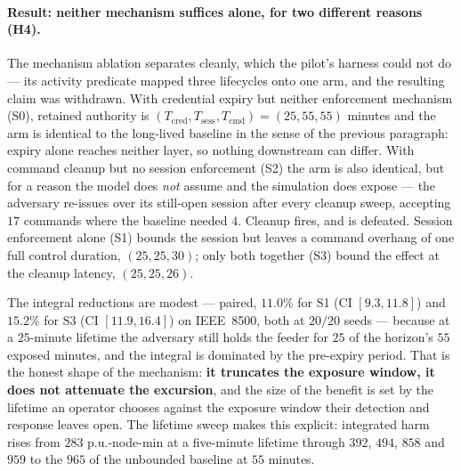 \paragraph{Result: neither mechanism suffices alone, for two different reasons (H4).} The
mechanism ablation separates cleanly, which the pilot's harness could not do --- its activity
predicate mapped three lifecycles onto one arm, and the resulting claim was withdrawn. With
credential expiry but neither enforcement mechanism (S0), retained authority is
$(T_{\mathrm{cred}}, T_{\mathrm{sess}}, T_{\mathrm{cmd}}) = (25, 55, 55)$ minutes and the arm is
identical to the long-lived baseline in the sense of the previous paragraph: expiry alone reaches
neither layer, so nothing downstream can differ. With command cleanup but no session enforcement
(S2) the arm is also identical, but for a reason the model does \emph{not} assume and the
simulation does expose --- the adversary re-issues over its still-open session after every cleanup
sweep, accepting $17$ commands where the baseline needed $4$. Cleanup fires, and is defeated.
Session enforcement alone (S1) bounds the session but leaves a command overhang of one full
control duration, $(25, 25, 30)$; only both together (S3) bound the effect at the cleanup latency,
$(25, 25, 26)$.

The integral reductions are modest --- paired, $11.0\%$ for S1 (CI $[9.3, 11.8]$) and $15.2\%$
for S3 (CI $[11.9, 16.4]$) on IEEE~8500, both at $20/20$ seeds --- because
at a $25$-minute lifetime the adversary still holds the feeder for $25$ of the horizon's $55$
exposed minutes, and the integral is dominated by the pre-expiry period. That is the honest shape
of the mechanism: \textbf{it truncates the exposure window, it does not attenuate the excursion},
and the size of the benefit is set by the lifetime an operator chooses against the exposure window
their detection and response leaves open. The lifetime sweep makes this explicit: integrated harm
rises from $283$ p.u.-node-min at a five-minute lifetime through $392$, $494$, $858$ and $959$ to
the $965$ of the unbounded baseline at $55$ minutes.


